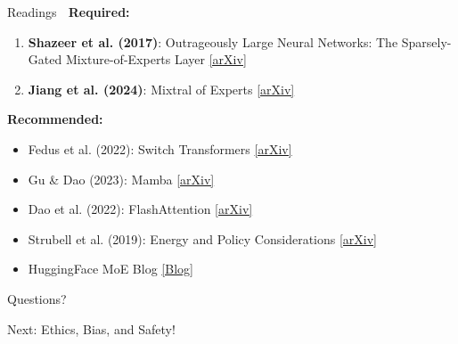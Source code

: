 \documentclass[aspectratio=169]{beamer}
\begin{document}
\begin{frame}[shrink=10]{Readings 📖}
\textbf{Required:}
\begin{enumerate}\setlength{\itemsep}{0pt}
    \item \textbf{Shazeer et al. (2017)}: Outrageously Large Neural Networks: The Sparsely-Gated Mixture-of-Experts Layer
    \href{https://arxiv.org/abs/1701.06538}{[arXiv]}

    \item \textbf{Jiang et al. (2024)}: Mixtral of Experts
    \href{https://arxiv.org/abs/2401.04088}{[arXiv]}
\end{enumerate}

\vspace{0.5em}

\textbf{Recommended:}
\begin{itemize}\setlength{\itemsep}{0pt}
    \item Fedus et al. (2022): Switch Transformers \href{https://arxiv.org/abs/2101.03961}{[arXiv]}
    \item Gu \& Dao (2023): Mamba \href{https://arxiv.org/abs/2312.00752}{[arXiv]}
    \item Dao et al. (2022): FlashAttention \href{https://arxiv.org/abs/2205.14135}{[arXiv]}
    \item Strubell et al. (2019): Energy and Policy Considerations \href{https://arxiv.org/abs/1906.02243}{[arXiv]}
    \item HuggingFace MoE Blog \href{https://huggingface.co/blog/moe}{[Blog]}
\end{itemize}
\end{frame}

\begin{frame}
\begin{center}
\Huge{Questions? 💬}

\vspace{2cm}

\Large{Next: Ethics, Bias, and Safety!}
\end{center}
\end{frame}
\end{document}
